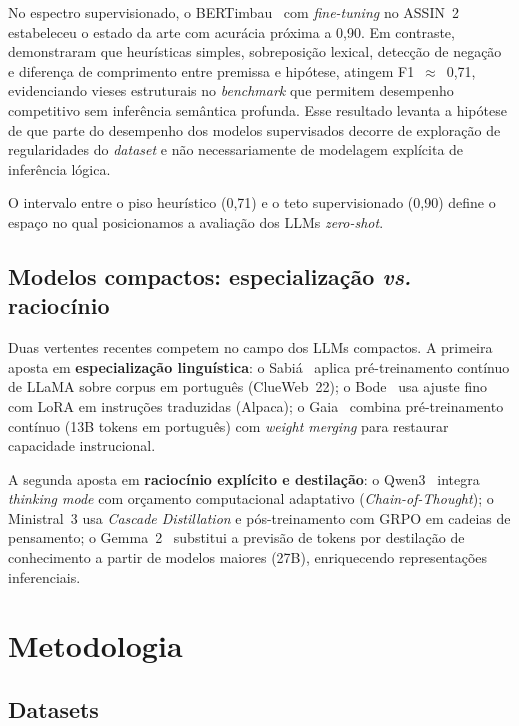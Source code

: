 \documentclass[12pt]{article}
\begin{document}
No espectro supervisionado, o BERTimbau~\cite{bert-models} com \emph{fine-tuning}
no ASSIN~2 estabeleceu o estado da arte com acurácia próxima a 0,90. Em
contraste, \cite{stil} demonstraram que heurísticas simples, sobreposição
lexical, detecção de negação e diferença de comprimento entre premissa e
hipótese, atingem F1~$\approx$~0,71, evidenciando vieses estruturais no
\emph{benchmark} que permitem desempenho competitivo sem inferência semântica
profunda. Esse resultado levanta a hipótese de que parte do desempenho dos
modelos supervisados decorre de exploração de regularidades do \emph{dataset}
e não necessariamente de modelagem explícita de inferência lógica.

O intervalo entre o piso heurístico (0,71) e o teto supervisionado (0,90)
define o espaço no qual posicionamos a avaliação dos LLMs \emph{zero-shot}.

\subsection{Modelos compactos: especialização \emph{vs.} raciocínio}

Duas vertentes recentes competem no campo dos LLMs compactos. A primeira aposta
em \textbf{especialização linguística}: o Sabiá~\cite{Pires_2023_sabia} aplica
pré-treinamento contínuo de LLaMA sobre corpus em português (ClueWeb~22); o
Bode~\cite{bode2024} usa ajuste fino com LoRA em instruções traduzidas (Alpaca);
o Gaia~\cite{gaia-gemma-3-4b-2025} combina pré-treinamento contínuo (13B tokens
em português) com \emph{weight merging} para restaurar capacidade instrucional.

A segunda aposta em \textbf{raciocínio explícito e destilação}: o
Qwen3~\cite{yang2025qwen3technicalreport} integra \emph{thinking mode} com
orçamento computacional adaptativo (\emph{Chain-of-Thought}); o Ministral~3
\cite{liu2026ministral3} usa \emph{Cascade Distillation} e pós-treinamento com
GRPO em cadeias de pensamento; o Gemma~2~\cite{gemmateam2024gemma2improvingopen}
substitui a previsão de tokens por destilação de conhecimento a partir de
modelos maiores (27B), enriquecendo representações inferenciais.

\section{Metodologia}

\subsection{Datasets}
\end{document}
